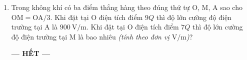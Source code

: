 \begin{enumerate}[label=\bfseries Câu \arabic*:]
\item Trong không khí có ba điểm thẳng hàng theo đúng thứ tự O, M, A sao cho $\text{OM}=\text{OA}/3$. Khi đặt tại O điện tích điểm $9Q$ thì độ lớn cường độ điện trường tại A là $\SI{900}{\volt/\meter}$. Khi đặt tại O điện tích điểm $7Q$ thì độ lớn cường độ điện trường tại M là bao nhiêu \textit{(tính theo đơn vị $\si{\volt/\meter}$)}?
\begin{center}
	\textbf{--- HẾT ---}
\end{center}


\end{enumerate}